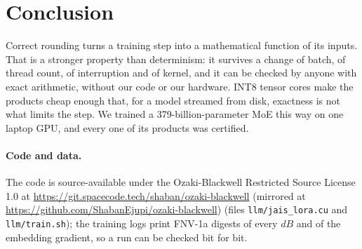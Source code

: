 \documentclass[11pt]{article}
\begin{document}
\section{Conclusion}
Correct rounding turns a training step into a mathematical function of its inputs. That is a stronger property than
determinism: it survives a change of batch, of thread count, of interruption and of kernel, and it can be checked by anyone
with exact arithmetic, without our code or our hardware. INT8 tensor cores make the products cheap enough that, for a model
streamed from disk, exactness is not what limits the step. We trained a 379-billion-parameter MoE this way on one laptop
GPU, and every one of its products was certified.

\paragraph{Code and data.} The code is source-available under the Ozaki-Blackwell Restricted Source License 1.0 at
\url{https://git.spacecode.tech/shaban/ozaki-blackwell} (mirrored at \url{https://github.com/ShabanEjupi/ozaki-blackwell})
(files \texttt{llm/jais\_lora.cu} and \texttt{llm/train.sh}); the training logs
print FNV-1a digests of every $dB$ and of the embedding gradient, so a run can be checked bit for bit.
\end{document}
